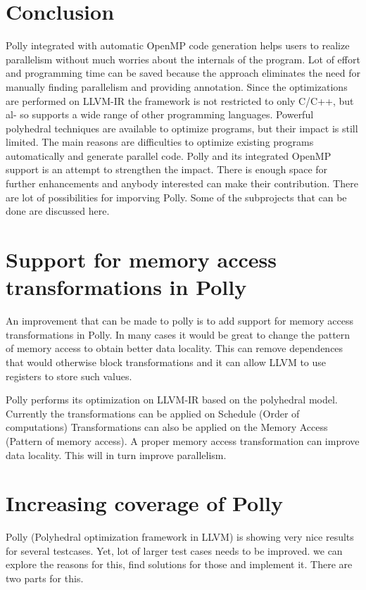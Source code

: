 \label{chap:future}

\section{Conclusion}
Polly integrated with automatic OpenMP code generation helps users to
realize parallelism without much worries about the internals of the program.
Lot of effort and programming time can be saved because
the approach eliminates the need for manually finding parallelism and providing annotation.
Since the optimizations are performed on LLVM-IR the framework is not restricted to only C/C++, but al-
so supports a wide range of other programming languages.
Powerful polyhedral techniques are available to optimize programs, but their impact is still limited. The main reasons
are difficulties to optimize existing programs automatically and generate parallel code. Polly and its integrated OpenMP support
is an attempt to strengthen the impact. There is enough space for further enhancements
and anybody interested can make their contribution. 
There are lot of possibilities for imporving Polly. Some of the subprojects
that can be done are discussed here.

\section{Support for memory access transformations in Polly}
An improvement that can be made to polly is to add support for memory access transformations in Polly.
In many cases it would be great to change the pattern of memory access to obtain better data locality.
This can remove dependences that would otherwise block transformations and it can allow LLVM to use registers to store such values.

Polly performs its optimization on LLVM-IR based on the polyhedral model. Currently the transformations can be applied on Schedule (Order of computations)
Transformations can also be applied on the Memory Access (Pattern of memory access). A proper memory access transformation can improve data locality. This will in turn improve parallelism.

\section{Increasing coverage of Polly}

Polly (Polyhedral optimization framework in LLVM) is showing very nice results for
several testcases. Yet, lot of larger test cases needs to be improved. we can explore
the reasons for this, find solutions for those and implement it. There are two parts for this.


